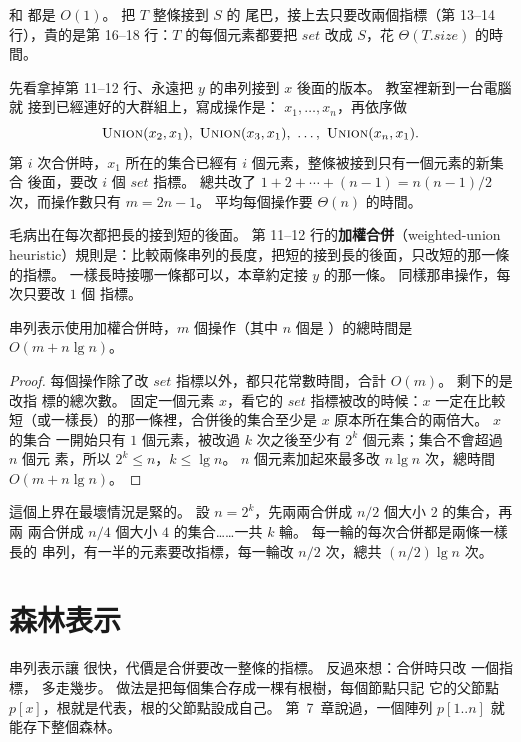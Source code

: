  和  都是 $O(1)$。  把 $T$ 整條接到 $S$ 的
尾巴，接上去只要改兩個指標（第 13--14 行），貴的是第 16--18 行：$T$ 的每個元素都要把
$\mathit{set}$ 改成 $S$，花 $\Theta(T.\mathit{size})$ 的時間。

先看拿掉第 11--12 行、永遠把 $y$ 的串列接到 $x$ 後面的版本。 教室裡新到一台電腦就
接到已經連好的大群組上，寫成操作是： $x_1, \ldots, x_n$，再依序做
\[
\proc{Union}(x_2, x_1),\ \proc{Union}(x_3, x_1),\ \ldots,\ \proc{Union}(x_n, x_1).
\]
第 $i$ 次合併時，$x_1$ 所在的集合已經有 $i$ 個元素，整條被接到只有一個元素的新集合
後面，要改 $i$ 個 $\mathit{set}$ 指標。 總共改了 $1 + 2 + \cdots + (n - 1) =
n(n-1)/2$ 次，而操作數只有 $m = 2n - 1$。 平均每個操作要 $\Theta(n)$ 的時間。

毛病出在每次都把長的接到短的後面。 第 11--12 行的\textbf{加權合併}（weighted-union
heuristic）規則是：比較兩條串列的長度，把短的接到長的後面，只改短的那一條的指標。
一樣長時接哪一條都可以，本章約定接 $y$ 的那一條。 同樣那串操作，每次只要改 $1$ 個
指標。

\begin{theorem}
\label{thm:ds-weighted-list}
串列表示使用加權合併時，$m$ 個操作（其中 $n$ 個是 ）的總時間是
$O(m + n \lg n)$。
\end{theorem}

\begin{proof}
每個操作除了改 $\mathit{set}$ 指標以外，都只花常數時間，合計 $O(m)$。 剩下的是改指
標的總次數。 固定一個元素 $x$，看它的 $\mathit{set}$ 指標被改的時候：$x$ 一定在比較
短（或一樣長）的那一條裡，合併後的集合至少是 $x$ 原本所在集合的兩倍大。 $x$ 的集合
一開始只有 $1$ 個元素，被改過 $k$ 次之後至少有 $2^k$ 個元素；集合不會超過 $n$ 個元
素，所以 $2^k \le n$，$k \le \lg n$。 $n$ 個元素加起來最多改 $n \lg n$ 次，總時間
$O(m + n \lg n)$。
\end{proof}

這個上界在最壞情況是緊的。 設 $n = 2^k$，先兩兩合併成 $n/2$ 個大小 $2$ 的集合，再兩
兩合併成 $n/4$ 個大小 $4$ 的集合……一共 $k$ 輪。 每一輪的每次合併都是兩條一樣長的
串列，有一半的元素要改指標，每一輪改 $n/2$ 次，總共 $(n/2)\lg n$ 次。

\section{森林表示}
\label{sec:ds-forest}

串列表示讓  很快，代價是合併要改一整條的指標。 反過來想：合併時只改
一個指標， 多走幾步。 做法是把每個集合存成一棵有根樹，每個節點只記
它的父節點 $p[x]$，根就是代表，根的父節點設成自己。 第~7~章說過，一個陣列
$p[1..n]$ 就能存下整個森林。

